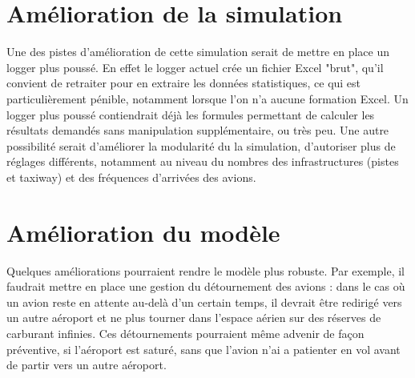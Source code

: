 
\section{Amélioration de la simulation}
Une des pistes d'amélioration de cette simulation serait de mettre en place un logger plus poussé. En effet le logger actuel crée un fichier Excel "brut", qu'il convient de retraiter pour en extraire les données statistiques, ce qui est particulièrement pénible, notamment lorsque l'on n'a aucune formation Excel. Un logger plus poussé contiendrait déjà les formules permettant de calculer les résultats demandés sans manipulation supplémentaire, ou très peu.
Une autre possibilité serait d'améliorer la modularité du la simulation, d'autoriser plus de réglages différents, notamment au niveau du nombres des infrastructures (pistes et taxiway) et des fréquences d'arrivées des avions.

\section{Amélioration du modèle}
Quelques améliorations pourraient rendre le modèle plus robuste. Par exemple, il faudrait mettre en place une gestion du détournement des avions : dans le cas où un avion reste en attente au-delà d'un certain temps, il devrait être redirigé vers un autre aéroport et ne plus tourner dans l'espace aérien sur des réserves de carburant infinies.
Ces détournements pourraient même advenir de façon préventive, si l'aéroport est saturé, sans que l'avion n'ai a patienter en vol avant de partir vers un autre aéroport.



